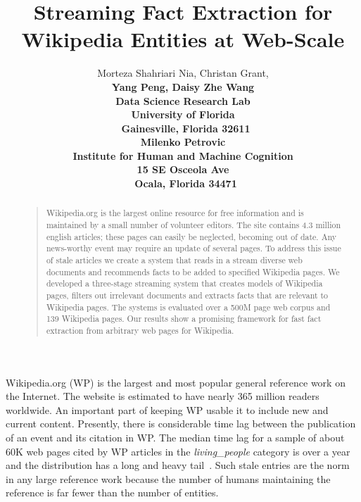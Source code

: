 \documentclass[letterpaper]{article}
\begin{document}
%
\title{Streaming Fact Extraction for Wikipedia Entities at Web-Scale}
\author{Morteza Shahriari Nia, Christan Grant, \\
\bf \large Yang Peng, Daisy Zhe Wang\\
Data Science Research Lab\\
University of Florida\\\
Gainesville, Florida 32611\\
\And Milenko Petrovic\\
Institute for Human and Machine Cognition\\ 15 SE Osceola Ave \\\ Ocala, Florida 34471
}


\maketitle
\begin{abstract}
\begin{quote}
Wikipedia.org is the largest online resource for free information and is maintained by a small number of volunteer editors.
The site contains 4.3 million english articles; these pages can easily be neglected, becoming out of date.
Any news-worthy event may require an update of several pages.
To address this issue of stale articles we create a system that reads
in a stream diverse web documents and recommends
facts to be added to specified Wikipedia pages.
We developed a three-stage streaming system that creates models of Wikipedia pages,
filters out irrelevant documents and 
extracts facts that are relevant to Wikipedia pages.
The systems is evaluated over a 500M page web corpus and 139 Wikipedia pages.
Our results show a promising framework for fast fact extraction from arbitrary web pages for Wikipedia.

\end{quote}
\end{abstract}

\noindent 

Wikipedia.org (WP) is the largest and most popular general reference work on the Internet.
The website is estimated to have nearly 365 million readers worldwide.
An important part of keeping WP usable it to include new and current content.
Presently, there is considerable time lag between the publication of an event and its citation in WP\@.
The median time lag for a sample of about 60K web pages cited by
 WP articles in the \textit{living\_people} category is over a year
 and the distribution has a long and heavy tail~\cite{JFrank12}.
Such stale entries are the norm in any large reference work because the number
of humans maintaining the reference is far fewer than the number of entities.
\end{document}
